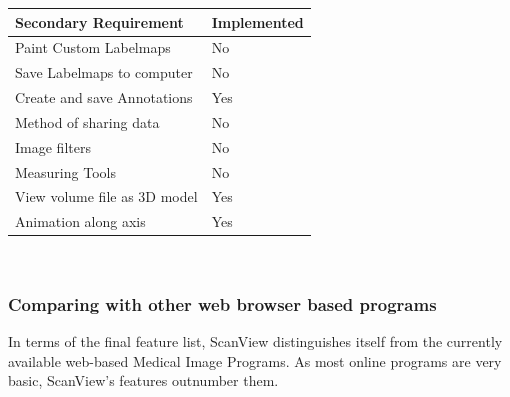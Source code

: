 \documentclass[a4paper,11pt,twoside]{article}
\begin{document}
\begin{center}

  \begin{tabular}{| l | l |}
    \hline
    Secondary Requirement & Implemented \\ \hline \hline
	Paint Custom Labelmaps & No\\ \hline
	Save Labelmaps to computer & No \\ \hline
	Create and save Annotations & Yes \\ \hline
	Method of sharing data & No \\ \hline
	Image filters & No \\ \hline
	Measuring Tools & No \\ \hline
	View volume file as 3D model & Yes \\ \hline
	Animation along axis & Yes \\ \hline



  \end{tabular}\\
\end{center}









\subsubsection{Comparing with other web browser based programs}

In terms of the final feature list, ScanView distinguishes itself from the currently available web-based Medical Image Programs. As most online programs are very basic, ScanView's features outnumber them. 
\end{document}
